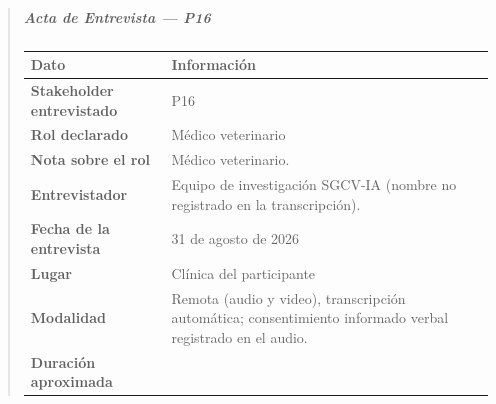 \documentclass[
]{article}
\newcounter{none} %
\begin{document}
\begin{quote}
\subparagraph{Acta de Entrevista --- P16}\label{acta-entrevista-p16}

{\def\LTcaptype{none} %
\begin{longtable}[]{|
  >{\raggedright\arraybackslash}p{}|
  >{\raggedright\arraybackslash}p{}|}
\hline
\begin{minipage}[b]{\linewidth}\centering
\textbf{Dato}
\end{minipage} & \begin{minipage}[b]{\linewidth}\centering
\textbf{Información}
\end{minipage} \\
\hline
\endhead
\hline
\endlastfoot
\textbf{Stakeholder entrevistado} & \begin{minipage}[t]{\linewidth}\raggedright
P16
\end{minipage} \\
\hline
\textbf{Rol declarado} & \begin{minipage}[t]{\linewidth}\raggedright
Médico veterinario
\end{minipage} \\
\hline
\textbf{Nota sobre el rol} & \begin{minipage}[t]{\linewidth}\raggedright
Médico veterinario.
\end{minipage} \\
\hline
\textbf{Entrevistador} & \begin{minipage}[t]{\linewidth}\raggedright
Equipo de investigación SGCV-IA (nombre no registrado en la transcripción).
\end{minipage} \\
\hline
\textbf{Fecha de la entrevista} & \begin{minipage}[t]{\linewidth}\raggedright
31 de agosto de 2026
\end{minipage} \\
\hline
\textbf{Lugar} & \begin{minipage}[t]{\linewidth}\raggedright
Clínica del participante
\end{minipage} \\
\hline
\textbf{Modalidad} & \begin{minipage}[t]{\linewidth}\raggedright
Remota (audio y video), transcripción automática; consentimiento informado verbal registrado en el audio.
\end{minipage} \\
\hline
\textbf{Duración aproximada} & \begin{minipage}[t]{\linewidth}\raggedright

\end{minipage}
\end{longtable}}
\end{quote}
\end{document}
